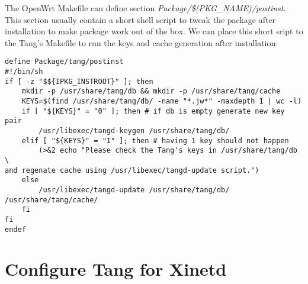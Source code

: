 The OpenWrt Makefile can define section {\it Package/\$(PKG\_NAME)/postinst}.
This section usually contain a short shell script to tweak the package after installation to make package work out of the box.
We can place this short sript to the Tang's Makefile to run the keys and cache generation after installation:
\begin{lstlisting}[columns=fixed,basicstyle=\ttfamily\footnotesize,tabsize=4,backgroundcolor=\color{yellow!10}]
define Package/tang/postinst
#!/bin/sh
if [ -z "$${IPKG_INSTROOT}" ]; then
	mkdir -p /usr/share/tang/db && mkdir -p /usr/share/tang/cache
	KEYS=$(find /usr/share/tang/db/ -name "*.jw*" -maxdepth 1 | wc -l)
	if [ "${KEYS}" = "0" ]; then # if db is empty generate new key pair
		/usr/libexec/tangd-keygen /usr/share/tang/db/
	elif [ "${KEYS}" = "1" ]; then # having 1 key should not happen
		(>&2 echo "Please check the Tang's keys in /usr/share/tang/db \
and regenate cache using /usr/libexec/tangd-update script.")
	else
		/usr/libexec/tangd-update /usr/share/tang/db/ /usr/share/tang/cache/
	fi
fi
endef
\end{lstlisting}



\section{Configure Tang for Xinetd}

